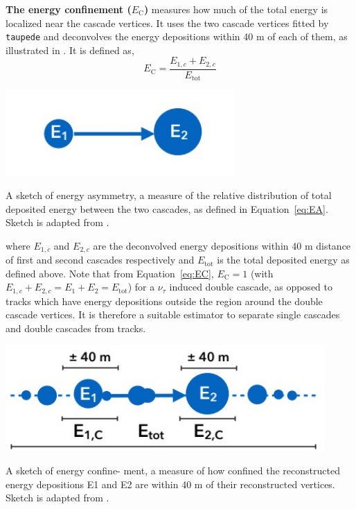 \textbf{The energy confinement ($E_{\text{C}}$)} measures how much of the total energy is localized near the cascade vertices. It uses the two cascade vertices fitted by \texttt{taupede} and deconvolves the energy depositions within 40 m of each of them, as illustrated in . It is defined as,
\begin{equation}\label{eq:EC}
    E_{\mathrm{C}} = \frac{E_{1,c}+E_{2,c}}{E_{\mathrm{tot}}}
\end{equation}
\begin{marginfigure}
	\includegraphics{./figures/EventSample/EA.pdf}
	\caption{A sketch of energy asymmetry, a measure of the relative distribution of total deposited energy between the two cascades, as defined in Equation~\ref{eq:EA}. Sketch is adapted from \cite{marcel_thesis}.}
\end{marginfigure}
where $E_{1,c}$ and $E_{2,c}$ are the deconvolved energy depositions within 40 m distance of first and second cascades respectively and $E_{\mathrm{tot}}$ is the total deposited energy as defined above. Note that from Equation~\ref{eq:EC}, $E_{\mathrm{C}}=1$ (with $E_{1,c}+E_{2,c}=E_1+E_2=E_{\mathrm{tot}}$) for a $\nu_{\tau}$ induced double cascade, as opposed to tracks which have energy depositions outside the region around the double cascade vertices. It is therefore a suitable estimator to separate single cascades and double cascades from tracks.
\begin{marginfigure}
	\includegraphics{./figures/EventSample/EC.pdf}
	\caption{A sketch of energy confine- ment, a measure of how confined the reconstructed energy depositions E1 and E2 are within 40 m of their reconstructed vertices. Sketch is adapted from \cite{marcel_thesis}.}
\end{marginfigure}

